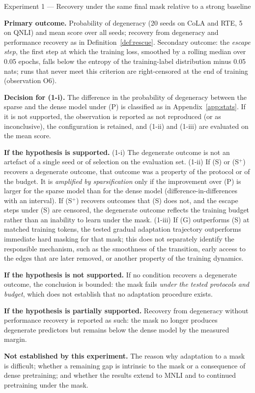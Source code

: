 \documentclass[10pt]{article}
\newcommand{\cardfield}[1]{\par\smallskip\noindent\textbf{#1.}\enspace}
\newcommand{\cardpos}[1]{\par\smallskip\noindent\textcolor{green!40!black}{\textbf{If the hypothesis is supported.}}\enspace}
\newcommand{\cardneg}[1]{\par\smallskip\noindent\textcolor{orange!75!black}{\textbf{If the hypothesis is not supported.}}\enspace}
\newcommand{\cardmixed}[1]{\par\smallskip\noindent\textcolor{gray!70!black}{\textbf{If the hypothesis is partially supported.}}\enspace}
\newcommand{\cardcannot}[1]{\par\smallskip\noindent\textbf{Not established by this experiment.}\enspace}
\begin{document}
\begin{expcard}{Experiment 1 --- Recovery under the same final mask relative to a strong baseline}
\cardfield{Primary outcome} Probability of degeneracy (20 seeds on CoLA and RTE, 5 on QNLI) and mean score over all seeds; recovery from degeneracy and performance recovery as in Definition~\ref{def:rescue}. Secondary outcome: the \emph{escape step}, the first step at which the training loss, smoothed by a rolling median over 0.05 epochs, falls below the entropy of the training-label distribution minus 0.05 nats; runs that never meet this criterion are right-censored at the end of training (observation O6).
\cardfield{Decision for (1-i)} The difference in the probability of degeneracy between the sparse and the dense model under (P) is classified as in Appendix~\ref{app:stats}. If it is not supported, the observation is reported as not reproduced (or as inconclusive), the configuration is retained, and (1-ii) and (1-iii) are evaluated on the mean score.
\cardpos{} (1-i) The degenerate outcome is not an artefact of a single seed or of selection on the evaluation set. (1-ii) If (S) or (S$^{+}$) recovers a degenerate outcome, that outcome was a property of the protocol or of the budget. It is \emph{amplified by sparsification} only if the improvement over (P) is larger for the sparse model than for the dense model (difference-in-differences with an interval). If (S$^{+}$) recovers outcomes that (S) does not, and the escape steps under (S) are censored, the degenerate outcome reflects the training budget rather than an inability to learn under the mask. (1-iii) If (G) outperforms (S) at matched training tokens, the tested gradual adaptation trajectory outperforms immediate hard masking for that mask; this does not separately identify the responsible mechanism, such as the smoothness of the transition, early access to the edges that are later removed, or another property of the training dynamics.
\cardneg{} If no condition recovers a degenerate outcome, the conclusion is bounded: the mask fails \emph{under the tested protocols and budget}, which does not establish that no adaptation procedure exists.
\cardmixed{} Recovery from degeneracy without performance recovery is reported as such: the mask no longer produces degenerate predictors but remains below the dense model by the measured margin.
\cardcannot{} The reason why adaptation to a mask is difficult; whether a remaining gap is intrinsic to the mask or a consequence of dense pretraining; and whether the results extend to MNLI and to continued pretraining under the mask.
\end{expcard}
\end{document}

